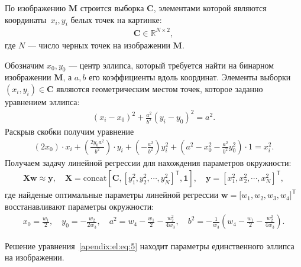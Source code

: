 \documentclass[12pt, twoside]{article}
\numberwithin{equation}{section}
\begin{document}
По изображению $\textbf{M}$ строится выборка $\textbf{C}$, элементами которой являются координаты~$x_i, y_i$ белых точек на картинке:
\begin{equation}
\label{apendix:el:eq:2}
\begin{aligned}
\textbf{C} \in  \mathbb{R}^{N \times 2},
\end{aligned}
\end{equation}
где $N$ --- число черных точек на изображении $\textbf{M}$.

Обозначим $x_0, y_0$ --- центр эллипса, который требуется найти на бинарном изображении $\textbf{M}$, а $a, b$ его коэффициенты вдоль координат. Элементы выборки $\left(x_i, y_i\right)\in\textbf{C}$ являются геометрическим местом точек, которое заданно уравнением эллипса:
\begin{equation}
\label{apendix:el:eq:3}
\begin{aligned}
\left(x_i - x_0\right)^{2}+\frac{a^2}{b^2}\left(y_i-y_0\right)^2 = a^2.
\end{aligned}
\end{equation}
Раскрыв скобки получим уравнение
\begin{equation}
\label{apendix:el:eq:4}
\begin{aligned}
\left(2x_0\right)\cdot x_i + \left(\frac{2y_0a^2}{b^2}\right)\cdot y_i + \left(-\frac{a^2}{b^2}\right)y_{i}^{2} + \left(a^2-x_0^2-\frac{a^2}{b^2}y_0^2\right)\cdot1 = x_{i}^2.
\end{aligned}
\end{equation}
Получаем задачу линейной регрессии для нахождения параметров окружности:
\begin{equation}
\label{apendix:el:eq:5}
\begin{aligned}
\textbf{X}\textbf{w} \approx \textbf{y},  \quad \textbf{X} = \text{concat}\left[\textbf{C}, \left[y_1^2, y_2^2, \cdots, y_N^2\right]^{\mathsf{T}}, \textbf{1}\right], \quad \textbf{y} = [x_1^2, x_2^2, \cdots, x_N^2]^{\mathsf{T}},
\end{aligned}
\end{equation}
где найденые оптимальные параметры линейной регрессии $\textbf{w} = \bigr[w_1, w_2, w_3, w_4\bigr]^{\mathsf{T}}$ восстанавливают параметры окружности:
\begin{equation}
\label{apendix:el:eq:6}
\begin{aligned}
x_0 = \frac{w_1}{2}, \quad y_0 = -\frac{w_2}{2w_3}, \quad a^2 = w_4-\frac{w_1}{2}-\frac{w_2^2}{4w_3}, \quad b^2 = -\frac{1}{w_3}\left(w_4-\frac{w_1}{2}-\frac{w_2^2}{4w_3}\right).
\end{aligned}
\end{equation}

Решение уравнения~\eqref{apendix:el:eq:5} находит параметры единственного эллипса на изображении.
\end{document}

